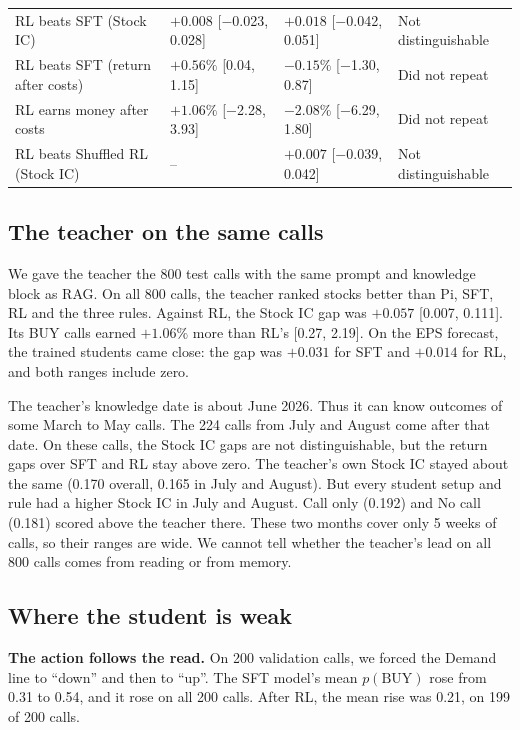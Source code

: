 \documentclass[sigconf,nonacm]{acmart}
\newcommand{\rng}[2]{{\scriptsize[#1, #2]}}
\begin{document}
\begin{table}[t]
\begin{tabularx}{\textwidth}{>{\raggedright\arraybackslash}p{4.4cm} >{\raggedright\arraybackslash}X >{\raggedright\arraybackslash}X >{\raggedright\arraybackslash}p{2.9cm}}
RL beats SFT (Stock IC) & $+0.008$ \rng{$-$0.023}{0.028} & $+0.018$ \rng{$-$0.042}{0.051} & Not distinguishable \\
RL beats SFT (return after costs) & $+0.56\%$ \rng{0.04}{1.15} & $-0.15\%$ \rng{$-$1.30}{0.87} & Did not repeat \\
RL earns money after costs & $+1.06\%$ \rng{$-$2.28}{3.93} & $-2.08\%$ \rng{$-$6.29}{1.80} & Did not repeat \\
RL beats Shuffled RL (Stock IC) & -- & $+0.007$ \rng{$-$0.039}{0.042} & Not distinguishable \\
\bottomrule
\end{tabularx}
\end{table}

\subsection{The teacher on the same calls}\label{sec:teacher}

We gave the teacher the 800 test calls with the same prompt and knowledge block as RAG.
On all 800 calls, the teacher ranked stocks better than Pi, SFT, RL and the three rules.
Against RL, the Stock IC gap was $+0.057$ \rng{0.007}{0.111}.
Its BUY calls earned $+1.06\%$ more than RL's \rng{0.27}{2.19}.
On the EPS forecast, the trained students came close: the gap was $+0.031$ for SFT and $+0.014$ for RL, and both ranges include zero.

The teacher's knowledge date is about June 2026.
Thus it can know outcomes of some March to May calls.
The 224 calls from July and August come after that date.
On these calls, the Stock IC gaps are not distinguishable, but the return gaps over SFT and RL stay above zero.
The teacher's own Stock IC stayed about the same (0.170 overall, 0.165 in July and August).
But every student setup and rule had a higher Stock IC in July and August.
Call only (0.192) and No call (0.181) scored above the teacher there.
These two months cover only 5 weeks of calls, so their ranges are wide.
We cannot tell whether the teacher's lead on all 800 calls comes from reading or from memory.

\subsection{Where the student is weak}\label{sec:weak}

\textbf{The action follows the read.}
On 200 validation calls, we forced the Demand line to ``down'' and then to ``up''.
The SFT model's mean $p(\text{BUY})$ rose from 0.31 to 0.54, and it rose on all 200 calls.
After RL, the mean rise was 0.21, on 199 of 200 calls.
\end{document}
